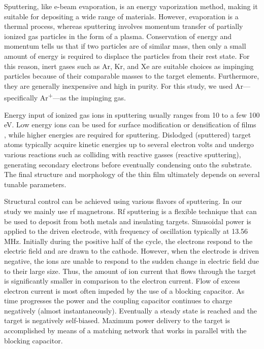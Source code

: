 Sputtering, like e-beam evaporation, is an energy vaporization method, making it suitable for depositing a wide range of materials. However, evaporation is a thermal process, whereas sputtering involves momentum transfer of partially ionized gas particles in the form of a plasma. Conservation of energy and momentum tells us that if two particles are of similar mass, then only a small amount of energy is required to displace the particles from their rest state. For this reason, inert gases such as Ar, Kr, and Xe are suitable choices as impinging particles because of their comparable masses to the target elements. Furthermore, they are generally inexpensive and high in purity. For this study, we used Ar---specifically Ar\textsuperscript{+}---as the impinging gas.

Energy input of ionized gas ions in sputtering usually ranges from 10 to a few 100 eV. Low energy ions can be used for surface modification or densification of films \cite{Coburn1972, Huang2010}, while higher energies are required for sputtering. Dislodged (sputtered) target atoms typically acquire kinetic energies up to several electron volts and undergo various reactions such as colliding with reactive gasses (reactive sputtering), generating secondary electrons before eventually condensing onto the substrate. The final structure and morphology of the thin film ultimately depends on several tunable parameters. 

Structural control can be achieved using various flavors of sputtering. In our study we mainly use rf magnetrons. Rf sputtering is a flexible technique that can be used to deposit from both metals and insulating targets. Sinusoidal power is applied to the driven electrode, with frequency of oscillation typically at 13.56 MHz. Initially during the positive half of the cycle, the electrons respond to the electric field and are drawn to the cathode. However, when the electrode is driven negative, the ions are unable to respond to the sudden change in electric field due to their large size. Thus, the amount of ion current that flows through the target is significantly smaller in comparison to the electron current. Flow of excess electron current is most often impeded by the use of a blocking capacitor. As time progresses the power and the coupling capacitor continues to charge negatively (almost instantaneously). Eventually a steady state is reached and the target is negatively self-biased. Maximum power delivery to the target is accomplished by means of a matching network that works in parallel with the blocking capacitor. 

